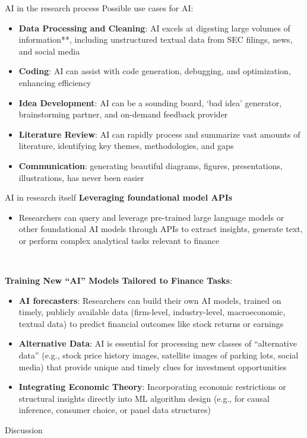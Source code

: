 \documentclass[xcolor=table, aspectratio=169]{beamer}
\newcommand{\alertbf}[1]{\alert{\textbf{#1}}}
\begin{document}
\begin{frame}{AI in the research process}
Possible use cases for AI:
    \begin{itemize}
        \item \alertbf{Data Processing and Cleaning}: AI excels at digesting large volumes of information**, including unstructured textual data from SEC filings, news, and social media 
        \item \alertbf{Coding}: AI can assist with code generation, debugging, and optimization, enhancing efficiency
        \item \alertbf{Idea Development}: AI can be a sounding board, `bad idea' generator, brainstorming partner, and on-demand feedback provider
        \item \alertbf{Literature Review}: AI can rapidly process and summarize vast amounts of literature, identifying key themes, methodologies, and gaps
        \item \alertbf{Communication}: generating beautiful diagrams, figures, presentations, illustrations, has never been easier
    \end{itemize}
\end{frame}

\begin{frame}{AI in research itself}
\alertbf{Leveraging foundational model APIs}
    \begin{itemize}
        \item Researchers can query and leverage pre-trained large language models or other foundational AI models through APIs to extract insights, generate text, or perform complex analytical tasks relevant to finance
    \end{itemize}

~

\alertbf{Training New ``AI'' Models Tailored to Finance Tasks}:
    \begin{itemize}
        \item \alertbf{AI forecasters}: Researchers can build their own AI models, trained on timely, publicly available data (firm-level, industry-level, macroeconomic, textual data) to predict financial outcomes like stock returns or earnings
        \item \alertbf{Alternative Data}: AI is essential for processing new classes of ``alternative data'' (e.g., stock price history images, satellite images of parking lots, social media) that provide unique and timely clues for investment opportunities
        \item \alertbf{Integrating Economic Theory}: Incorporating economic restrictions or structural insights directly into ML algorithm design (e.g., for causal inference, consumer choice, or panel data structures) 
    \end{itemize}
    
\end{frame}

\begin{frame}{Discussion}
    
\end{frame}
\end{document}
